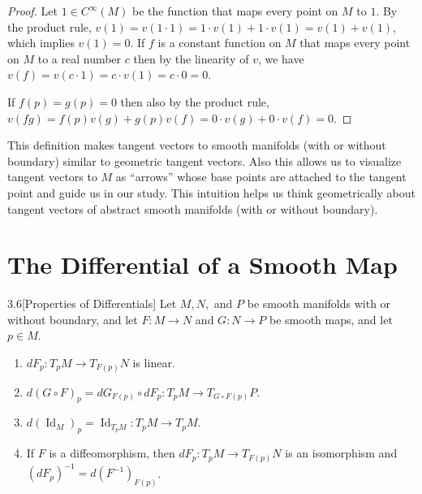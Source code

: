 \begin{proof}
    Let \( 1 \in C^{\infty}(M) \) be the function that maps every point on \( M \) to \( 1 \). By the product rule, \( v(1) = v(1 \cdot 1) = 1\cdot v(1) + 1\cdot v(1) = v(1) + v(1) \), which implies \( v(1) = 0 \). If \( f \) is a constant function on \( M \) that maps every point on \( M \) to a real number \( c\) then by the linearity of \( v \), we have \( v(f) = v(c\cdot 1) = c \cdot v(1) = c \cdot 0 = 0 \).

    If \( f(p) = g(p) = 0 \) then also by the product rule, \( v(fg) = f(p)v(g) + g(p)v(f) = 0\cdot v(g) + 0\cdot v(f) = 0 \).
\end{proof}

This definition makes tangent vectors to smooth manifolds (with or without boundary) similar to geometric tangent vectors. Also this allows us to visualize tangent vectors to \( M \) as ``arrows'' whose base points are attached to the tangent point and guide us in our study. This intuition helps us think geometrically about tangent vectors of abstract smooth manifolds (with or without boundary).

\section{The Differential of a Smooth Map}

\begin{prop}{3.6}[Properties of Differentials]
    Let \( M, N, \) and \( P \) be smooth manifolds with or without boundary, and let \( F: M \to N \) and \( G: N \to P \) be smooth maps, and let \( p \in M \).
    \begin{enumerate}[label={(\alph*)},itemsep=0pt]
        \item \( dF_{p}: T_{p}M \to T_{F(p)}N \) is linear.
        \item \( d{(G \circ F)}_{p} = dG_{F(p)} \circ dF_{p}: T_{p}M \to T_{G \circ F(p)}P \).
        \item \( d{(\operatorname{Id}_{M})}_{p} = \operatorname{Id}_{T_{p}M}: T_{p}M \to T_{p}M \).
        \item If \( F \) is a diffeomorphism, then \( dF_{p}: T_{p}M \to T_{F(p)}N \) is an isomorphism and \( {(dF_{p})}^{-1} = d{(F^{-1})}_{F(p)} \).
    \end{enumerate}
\end{prop}

